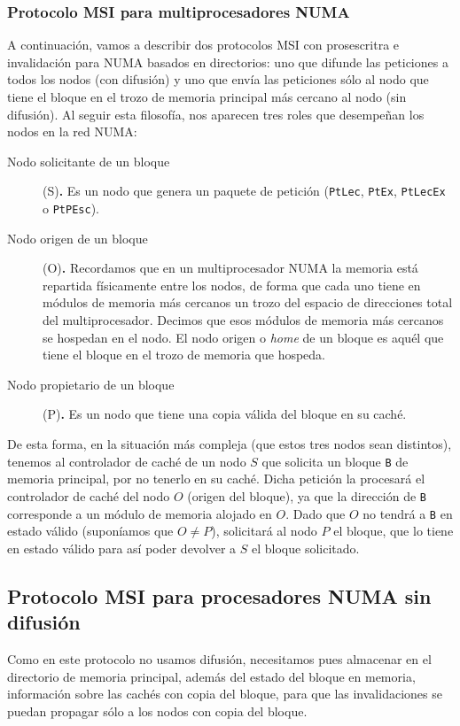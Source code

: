 \subsubsection{Protocolo MSI para multiprocesadores NUMA}
A continuación, vamos a describir dos protocolos MSI con prosescritra e invalidación para NUMA basados en directorios: uno que difunde las peticiones a todos los nodos (con difusión) y uno que envía las peticiones sólo al nodo que tiene el bloque en el trozo de memoria principal más cercano al nodo (sin difusión). Al seguir esta filosofía, nos aparecen tres roles que desempeñan los nodos en la red NUMA\@:
\begin{description}
    \item [Nodo solicitante de un bloque] (S)\textbf{.} Es un nodo que genera un paquete de petición (\verb|PtLec|, \verb|PtEx|, \verb|PtLecEx| o \verb|PtPEsc|).
    \item [Nodo origen de un bloque] (O)\textbf{.} Recordamos que en un multiprocesador NUMA la memoria está repartida físicamente entre los nodos, de forma que cada uno tiene en módulos de memoria más cercanos un trozo del espacio de direcciones total del multiprocesador. Decimos que esos módulos de memoria más cercanos se hospedan en el nodo. El nodo origen o \emph{home} de un bloque es aquél que tiene el bloque en el trozo de memoria que hospeda.
    \item [Nodo propietario de un bloque] (P)\textbf{.} Es un nodo que tiene una copia válida del bloque en su caché.
\end{description}
De esta forma, en la situación más compleja (que estos tres nodos sean distintos), tenemos al controlador de caché de un nodo $S$ que solicita un bloque \verb|B| de memoria principal, por no tenerlo en su caché. Dicha petición la procesará el controlador de caché del nodo $O$ (origen del bloque), ya que la dirección de \verb|B| corresponde a un módulo de memoria alojado en $O$. Dado que $O$ no tendrá a \verb|B| en estado válido (suponíamos que $O\neq P$), solicitará al nodo $P$ el bloque, que lo tiene en estado válido para así poder devolver a $S$ el bloque solicitado.

\subsection{Protocolo MSI para procesadores NUMA sin difusión}
Como en este protocolo no usamos difusión, necesitamos pues almacenar en el directorio de memoria principal, además del estado del bloque en memoria, información sobre las cachés con copia del bloque, para que las invalidaciones se puedan propagar sólo a los nodos con copia del bloque.

